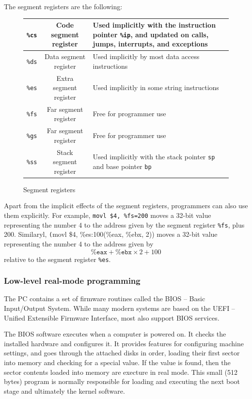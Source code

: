 \documentclass[toc]{../cs-classes/cs-classes}
\begin{document}
The segment registers are the following:
\begin{figure}[H]
    \centering
    \begin{tabular}{|c|c|p{8cm}|}
        \hline
        \texttt{\%cs} & Code segment register & Used implicitly with the instruction pointer \texttt{\%ip}, and updated on calls, jumps, interrupts, and exceptions\\
        \hline
        \texttt{\%ds} & Data segment register & Used implicitly by most data access instructions\\
        \hline
        \texttt{\%es} & Extra segment register & Used implicitly in some string instructions\\
        \hline
        \texttt{\%fs} & Far segment register & Free for programmer use\\
        \hline
        \texttt{\%gs} & Far segment register & Free for programmer use\\
        \hline
        \texttt{\%ss} & Stack segment register & Used implicitly with the stack pointer \texttt{sp} and base pointer \texttt{bp}\\
        \hline
    \end{tabular}
    \caption{Segment registers}
\end{figure}
Apart from the implicit effects of the segment registers, programmers can also use them explicitly. For example, \texttt{movl \$4, \%fs=200} moves a 32-bit value representing the number 4 to the address given by the segment register \texttt{\%fs}, plus 200. Similaryl, \texttt(movl \$4, \%es:100(\%eax, \%ebx, 2)) moves a 32-bit value representing the number 4 to the address given by
\begin{equation*}
    \texttt{\%eax} + \texttt{\%ebx} \times 2 + 100
\end{equation*}
relative to the segment register \texttt{\%es}.

\subsubsection{Low-level real-mode programming}
The PC contains a set of firmware routines called the BIOS -- Basic Input/Output System. While many modern systems are based on the UEFI -- Unified Extensible Firmware Interface, most also support BIOS services.

The BIOS software executes when a computer is powered on. It checks the installed hardware and configures it. It provides features for configuring machine settings, and goes through the attached disks in order, loading their first sector into memory and checking for a special value. If the value is found, then the sector contents loaded into memory are execture in real mode. This small (512 bytes) program is normally responsible for loading and executing the next boot stage and ultimately the kernel software.
\end{document}
